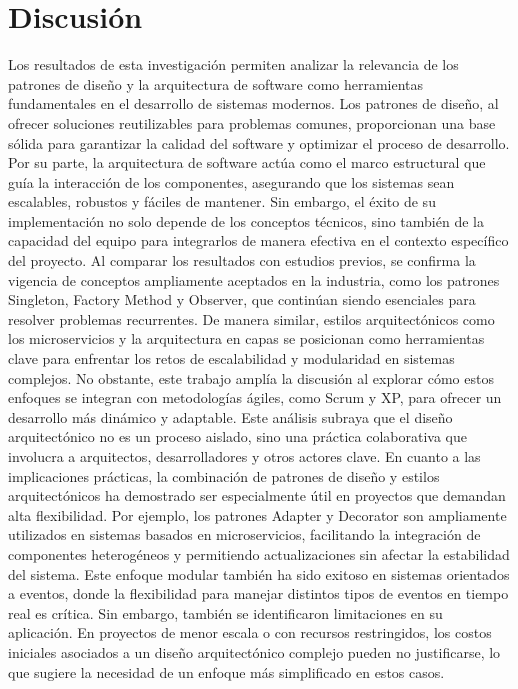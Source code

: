 \documentclass[conference]{IEEEtran}
\begin{document}
\section{Discusi\'on}
Los resultados de esta investigación permiten analizar la relevancia de los patrones de diseño y la arquitectura de software como herramientas fundamentales en el desarrollo de sistemas modernos. Los patrones de diseño, al ofrecer soluciones reutilizables para problemas comunes, proporcionan una base sólida para garantizar la calidad del software y optimizar el proceso de desarrollo. Por su parte, la arquitectura de software actúa como el marco estructural que guía la interacción de los componentes, asegurando que los sistemas sean escalables, robustos y fáciles de mantener. Sin embargo, el éxito de su implementación no solo depende de los conceptos técnicos, sino también de la capacidad del equipo para integrarlos de manera efectiva en el contexto específico del proyecto.
Al comparar los resultados con estudios previos, se confirma la vigencia de conceptos ampliamente aceptados en la industria, como los patrones Singleton, Factory Method y Observer, que continúan siendo esenciales para resolver problemas recurrentes. De manera similar, estilos arquitectónicos como los microservicios y la arquitectura en capas se posicionan como herramientas clave para enfrentar los retos de escalabilidad y modularidad en sistemas complejos. No obstante, este trabajo amplía la discusión al explorar cómo estos enfoques se integran con metodologías ágiles, como Scrum y XP, para ofrecer un desarrollo más dinámico y adaptable. Este análisis subraya que el diseño arquitectónico no es un proceso aislado, sino una práctica colaborativa que involucra a arquitectos, desarrolladores y otros actores clave.
En cuanto a las implicaciones prácticas, la combinación de patrones de diseño y estilos arquitectónicos ha demostrado ser especialmente útil en proyectos que demandan alta flexibilidad. Por ejemplo, los patrones Adapter y Decorator son ampliamente utilizados en sistemas basados en microservicios, facilitando la integración de componentes heterogéneos y permitiendo actualizaciones sin afectar la estabilidad del sistema. Este enfoque modular también ha sido exitoso en sistemas orientados a eventos, donde la flexibilidad para manejar distintos tipos de eventos en tiempo real es crítica. Sin embargo, también se identificaron limitaciones en su aplicación. En proyectos de menor escala o con recursos restringidos, los costos iniciales asociados a un diseño arquitectónico complejo pueden no justificarse, lo que sugiere la necesidad de un enfoque más simplificado en estos casos.
\end{document}
